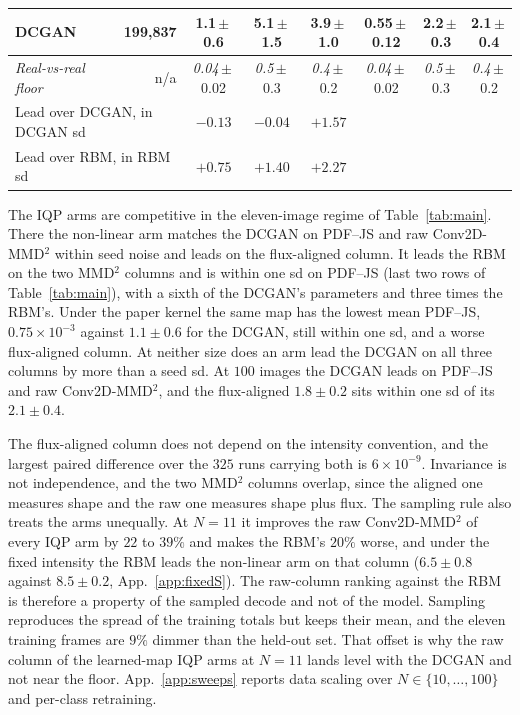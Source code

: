 \documentclass{article}
\begin{document}
\begin{table}[t]
\begin{tabular}{lrcccccc}
DCGAN~\cite{radford_2015_unsupervised} & 199{,}837   & 1.1\,$\pm$\,0.6 & 5.1\,$\pm$\,1.5 & 3.9\,$\pm$\,1.0 & \textbf{0.55}\,$\pm$\,0.12 & 2.2\,$\pm$\,0.3 & 2.1\,$\pm$\,0.4 \\
\midrule
\textit{Real-vs-real floor} & n/a & \textit{0.04}\,$\pm$\,0.02 & \textit{0.5}\,$\pm$\,0.3 & \textit{0.4}\,$\pm$\,0.2 & \textit{0.04}\,$\pm$\,0.02 & \textit{0.5}\,$\pm$\,0.3 & \textit{0.4}\,$\pm$\,0.2 \\
\midrule
\multicolumn{2}{l}{Lead over DCGAN, in DCGAN sd} & $-0.13$ & $-0.04$ & $+1.57$ & & & \\
\multicolumn{2}{l}{Lead over RBM, in RBM sd} & $+0.75$ & $+1.40$ & $+2.27$ & & & \\
\bottomrule
\end{tabular}
\end{table}

The IQP arms are competitive in the eleven-image regime of Table~\ref{tab:main}. There the
non-linear arm matches the DCGAN on PDF--JS and raw Conv2D-MMD$^2$ within seed noise and leads on
the flux-aligned column. It leads the RBM on the two MMD$^2$ columns and is within one sd on PDF--JS
(last two rows of Table~\ref{tab:main}), with a sixth of the DCGAN's parameters and three times the
RBM's. Under the paper kernel the same map has the
lowest mean PDF--JS, $0.75 \times 10^{-3}$ against $1.1 \pm 0.6$ for the DCGAN, still within one sd,
and a worse flux-aligned column. At neither size does an arm lead the DCGAN on all three columns by
more than a seed sd. At $100$ images the DCGAN leads on PDF--JS and raw Conv2D-MMD$^2$, and the
flux-aligned $1.8 \pm 0.2$ sits within one sd of its $2.1 \pm 0.4$.

The flux-aligned column does not depend on the intensity convention, and the largest paired
difference over the $325$ runs carrying both is $6\times10^{-9}$. Invariance is not independence, and the two MMD$^2$ columns
overlap, since the aligned one measures shape and the raw one measures shape plus flux. The
sampling rule also treats the arms unequally. At $N{=}11$ it improves the raw Conv2D-MMD$^2$ of
every IQP arm by $22$ to $39\%$ and makes the RBM's $20\%$ worse, and under the fixed intensity the
RBM leads the non-linear arm on that column ($6.5 \pm 0.8$ against $8.5 \pm 0.2$,
App.~\ref{app:fixedS}). The raw-column ranking against the RBM is therefore a property of the
sampled decode and not of the model. Sampling reproduces the spread of the training totals but keeps
their mean, and the eleven training frames are $9\%$ dimmer than the held-out set. That offset is why
the raw column of the learned-map IQP arms at $N{=}11$ lands level with the DCGAN and not near the floor. App.~\ref{app:sweeps} reports data scaling over $N \in \{10,\dots,100\}$ and per-class
retraining.
\end{document}
